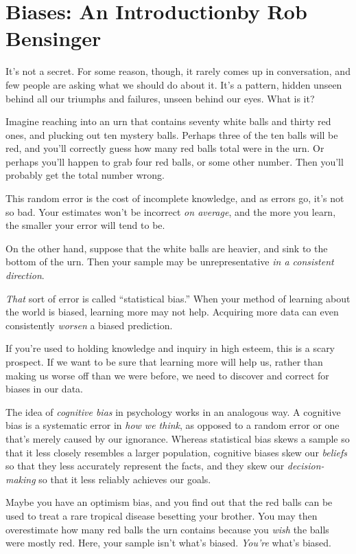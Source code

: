 \documentclass[letterpaper]{book}
\newcounter{mysection}
\newcommand{\mysectiontwo}[2]{
  \section*{#2}
  \addcontentsline{toc}{section}{#1}
  \setcounter{footnote}{0}
}
\begin{document}
\mysectiontwo{Biases: An Introduction}{Biases: An Introduction\newline by Rob Bensinger}

{
 It's not a secret. For some reason, though, it
rarely comes up in conversation, and few people are asking what we
should do about it. It's a pattern, hidden unseen
behind all our triumphs and failures, unseen behind our eyes. What is
it?}

{
 Imagine reaching into an urn that contains seventy white balls and
thirty red ones, and plucking out ten mystery balls. Perhaps three of
the ten balls will be red, and you'll correctly guess
how many red balls total were in the urn. Or perhaps
you'll happen to grab four red balls, or some other
number. Then you'll probably get the total number
wrong.}

{
 This random error is the cost of incomplete knowledge, and as
errors go, it's not so bad. Your estimates
won't be incorrect \textit{on average}, and the more
you learn, the smaller your error will tend to be.}

{
 On the other hand, suppose that the white balls are heavier, and
sink to the bottom of the urn. Then your sample may be unrepresentative
\textit{in a consistent direction}.}

{
 \textit{That} sort of error is called
``statistical bias.'' When your
method of learning about the world is biased, learning more may not
help. Acquiring more data can even consistently \textit{worsen} a
biased prediction.}

{
 If you're used to holding knowledge and inquiry in
high esteem, this is a scary prospect. If we want to be sure that
learning more will help us, rather than making us worse off than we
were before, we need to discover and correct for biases in our data.}

{
 The idea of \textit{cognitive bias} in psychology works in an
analogous way. A cognitive bias is a systematic error in \textit{how we
think}, as opposed to a random error or one that's
merely caused by our ignorance. Whereas statistical bias skews a sample
so that it less closely resembles a larger population, cognitive biases
skew our \textit{beliefs} so that they less accurately represent the
facts, and they skew our \textit{decision-making} so that it less
reliably achieves our goals.}

{
 Maybe you have an optimism bias, and you find out that the red
balls can be used to treat a rare tropical disease besetting your
brother. You may then overestimate how many red balls the urn contains
because you \textit{wish} the balls were mostly red. Here, your sample
isn't what's biased.
\textit{You're} what's biased.}
\end{document}
